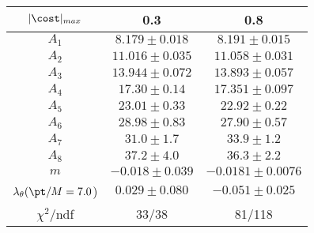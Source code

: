 \begin{tabular}{c|c|c}
$|\cost|_{max}$ & 0.3 & 0.8\\
\hline
$A_1$ & $8.179\pm0.018$ & $8.191\pm0.015$ \\
$A_2$ & $11.016\pm0.035$ & $11.058\pm0.031$ \\
$A_3$ & $13.944\pm0.072$ & $13.893\pm0.057$ \\
$A_4$ & $17.30\pm0.14$ & $17.351\pm0.097$ \\
$A_5$ & $23.01\pm0.33$ & $22.92\pm0.22$ \\
$A_6$ & $28.98\pm0.83$ & $27.90\pm0.57$ \\
$A_7$ & $31.0\pm1.7$ & $33.9\pm1.2$ \\
$A_8$ & $37.2\pm4.0$ & $36.3\pm2.2$ \\
$m$ & $-0.018\pm0.039$ & $-0.0181\pm0.0076$ \\
$\lambda_\theta(\pt/M = 7.0$) & $0.029\pm0.080$ & $-0.051\pm0.025$ \\
\hline
$\chi^2$/ndf & 33/38 & 81/118
\end{tabular}
